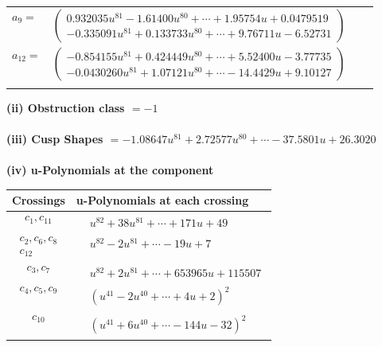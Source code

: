 \documentclass[1p]{elsarticle_modified}
\theoremstyle{definition}
\begin{document}
\begin{tabular}{m{7pt} m{180pt} m{7pt} m{180pt} }
\flushright $a_{9}=$&$\begin{pmatrix}0.932035 u^{81}-1.61400 u^{80}+\cdots+1.95754 u+0.0479519\\-0.335091 u^{81}+0.133733 u^{80}+\cdots+9.76711 u-6.52731\end{pmatrix}$ \\
\flushright $a_{12}=$&$\begin{pmatrix}-0.854155 u^{81}+0.424449 u^{80}+\cdots+5.52400 u-3.77735\\-0.0430260 u^{81}+1.07121 u^{80}+\cdots-14.4429 u+9.10127\end{pmatrix}$\\&\end{tabular}
\flushleft \textbf{(ii) Obstruction class $= -1$}\\~\\
\flushleft \textbf{(iii) Cusp Shapes $= -1.08647 u^{81}+2.72577 u^{80}+\cdots-37.5801 u+26.3020$}\\~\\
\newpage\renewcommand{\arraystretch}{1}
\flushleft \textbf{(iv) u-Polynomials at the component}\newline \\
\begin{tabular}{m{50pt}|m{274pt}}
Crossings & \hspace{64pt}u-Polynomials at each crossing \\
\hline $$\begin{aligned}c_{1},c_{11}\end{aligned}$$&$\begin{aligned}
&u^{82}+38 u^{81}+\cdots+171 u+49
\end{aligned}$\\
\hline $$\begin{aligned}c_{2},c_{6},c_{8}\\c_{12}\end{aligned}$$&$\begin{aligned}
&u^{82}-2 u^{81}+\cdots-19 u+7
\end{aligned}$\\
\hline $$\begin{aligned}c_{3},c_{7}\end{aligned}$$&$\begin{aligned}
&u^{82}+2 u^{81}+\cdots+653965 u+115507
\end{aligned}$\\
\hline $$\begin{aligned}c_{4},c_{5},c_{9}\end{aligned}$$&$\begin{aligned}
&(u^{41}-2 u^{40}+\cdots+4 u+2)^{2}
\end{aligned}$\\
\hline $$\begin{aligned}c_{10}\end{aligned}$$&$\begin{aligned}
&(u^{41}+6 u^{40}+\cdots-144 u-32)^{2}
\end{aligned}$\\
\hline
\end{tabular}\\~\\
\end{document}
